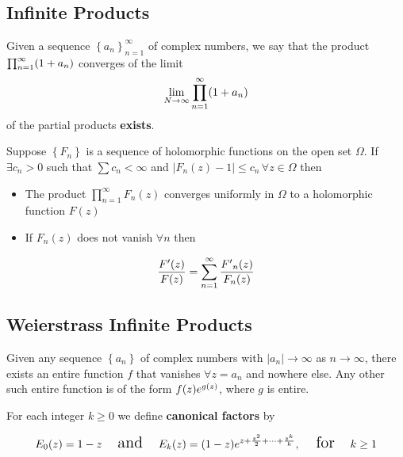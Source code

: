 \documentclass[11pt]{article}
\providecommand{\tightlist}{%
      \setlength{\itemsep}{0pt}\setlength{\parskip}{0pt}}
\newcommand{\prompt}[4]{
        {\ttfamily\llap{{\color{#2}[#3]:\hspace{3pt}#4}}\vspace{-\baselineskip}}
    }
\begin{document}
            
\prompt{Out}{outcolor}{4}{}
    
    \begin{center}
    \end{center}
    { \hspace*{\fill} \\}
    

    \subsection{Infinite Products}\label{infinite-products}

Given a sequence \(\left\{a_{n}\right\}_{n=1}^{\infty}\) of complex
numbers, we say that the product
\(\large \prod_{n=1}^{\infty}(1+a_{n})\) converges of the limit
\[\huge \lim_{N\to\infty}\prod_{n=1}^{\infty}(1+a_{n})\] of the partial
products \textbf{exists}.

Suppose \(\left\{F_{n}\right\}\) is a sequence of holomorphic functions
on the open set \(\Omega\). If \(\exists c_{n} > 0\) such that
\(\sum c_{n} < \infty\) and
\(|F_{n}(z)-1| \le c_{n}\,\forall z\in\Omega\) then

\begin{itemize}
\tightlist
\item
  The product \(\prod_{n=1}^{\infty}F_{n}(z)\) converges uniformly in
  \(\Omega\) to a holomorphic function \(F(z)\)
\item
  If \(F_{n}(z)\) does not vanish \(\forall n\) then
\end{itemize}

\[\huge \dfrac{{F^{\prime}}(z)}{F(z)}=\sum_{n=1}^{\infty}\dfrac{{F^{\prime}}_{n}(z)}{F_{n}(z)}\]

    \subsection{Weierstrass Infinite
Products}\label{weierstrass-infinite-products}

Given any sequence \(\left\{a_{n}\right\}\) of complex numbers with
\(|a_{n}|\to\infty\) as \(n\to\infty\), there exists an entire function
\(f\) that vanishes \(\forall z=a_{n}\) and nowhere else. Any other such
entire function is of the form \(\large f(z)e^{g(z)}\), where \(g\) is
entire.

For each integer \(k\ge0\) we define \textbf{canonical factors} by

\[\Large E_{0}(z)=1-z\quad\text{and}\quad E_{k}(z)=(1-z)e^{z+\frac{z^{2}}{2}+\cdots+\frac{z^{k}}{k}},\quad\text{for}\quad k\ge1\]
\end{document}
